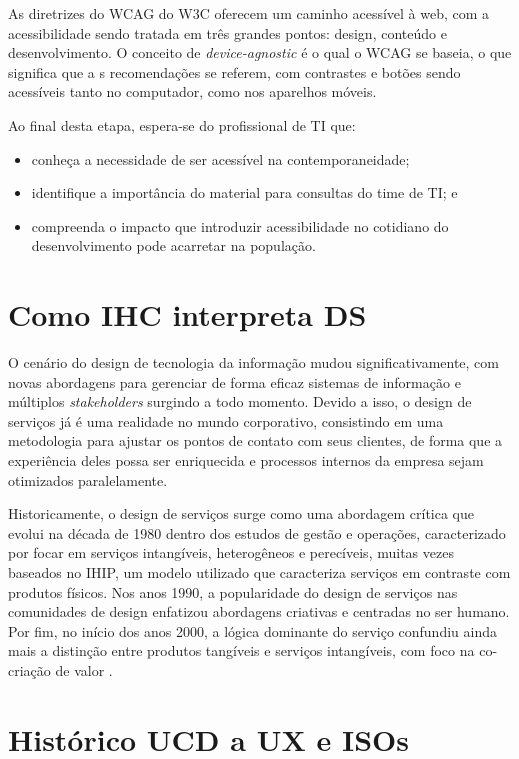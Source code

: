 \documentclass[
  12pt,
  openright,
  twoside,
  a4paper,
  english,
  french,
  spanish,
  brazil
]{abntex2}
\begin{document}
As diretrizes do WCAG do W3C oferecem um caminho acessível à web, com a
acessibilidade sendo tratada em três grandes pontos: design, conteúdo e
desenvolvimento. O conceito de \textit{device-agnostic} é o qual o WCAG se
baseia, o que significa que a s recomendações se referem, com contrastes e
botões sendo acessíveis tanto no computador, como nos aparelhos móveis.

Ao final desta etapa, espera-se do profissional de TI que:

\begin{itemize}
  \item conheça a necessidade de ser acessível na contemporaneidade;
  \item identifique a importância do material para consultas do time de TI; e
  \item
    compreenda o impacto que introduzir acessibilidade no cotidiano do
    desenvolvimento pode acarretar na população.
\end{itemize}

\chapter{Como IHC interpreta DS}

O cenário do design de tecnologia da informação mudou significativamente, com
novas abordagens para gerenciar de forma eficaz sistemas de informação e
múltiplos \textit{stakeholders} surgindo a todo momento. Devido a isso, o design
de serviços já é uma realidade no mundo corporativo, consistindo em uma
metodologia para ajustar os pontos de contato com seus clientes, de forma que a
experiência deles possa ser enriquecida e processos internos da empresa sejam
otimizados paralelamente.

Historicamente, o design de serviços surge como uma abordagem crítica que evolui
na década de 1980 dentro dos estudos de gestão e operações, caracterizado por
focar em serviços intangíveis, heterogêneos e perecíveis, muitas vezes baseados
no IHIP, um modelo utilizado que caracteriza serviços em contraste com produtos
físicos. Nos anos 1990, a popularidade do design de serviços nas comunidades de
design enfatizou abordagens criativas e centradas no ser humano. Por fim, no
início dos anos 2000, a lógica dominante do serviço confundiu ainda mais a
distinção entre produtos tangíveis e serviços intangíveis, com foco na
co-criação de valor \cite{DAP:Guia-de-Boas-Praticas}.

\chapter{Histórico UCD a UX e ISOs}
\end{document}

